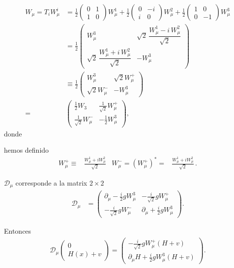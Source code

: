 \begin{align}
\label{eq:w22}
      W_\mu=T_i W^{i}_\mu&=
  \frac{1}{2}\begin{pmatrix}
    0&1\\
    1&0
  \end{pmatrix}W^1_\mu+
  \frac{1}{2}\begin{pmatrix}
    0&-i\\
    i&0
  \end{pmatrix}W^2_\mu+
  \frac{1}{2}\begin{pmatrix}
    1&0\\
    0&-1
  \end{pmatrix}W^3_\mu\nonumber\\
  &=
  \frac{1}{2}\begin{pmatrix}
    W^3_\mu                                  &\sqrt{2}\,\dfrac{W^1_\mu-i\,W^2_\mu}{\sqrt{2}}\\
    \sqrt{2}\,\dfrac{W^1_\mu+i\,W^2_\mu}{\sqrt{2}} &-W^3_\mu
  \end{pmatrix}\nonumber\\
  &\equiv
  \frac{1}{2}\begin{pmatrix}
    W^3_\mu&\sqrt{2}W^+_\mu\\
    \sqrt{2}W^-_\mu&-W^3_\mu
  \end{pmatrix}\nonumber\\
=&\begin{pmatrix}
    \frac{1}{2}W_3&\frac{1}{\sqrt{2}}W^+_\mu\\
    \frac{1}{\sqrt{2}}W^-_\mu&-\frac{1}{2}W^3_\mu
  \end{pmatrix},
\end{align}
donde
\begin{frame}
hemos definido
\begin{align}
  W_{\mu}^{+}\equiv& \frac{W_{\mu}^1+i W_{\mu}^2}{\sqrt{2}} & 
  W_{\mu}^{-}=\left( W_{\mu}^{+} \right)^{*}=& \frac{W_{\mu}^1+i W_{\mu}^2}{\sqrt{2}}\,. 
\end{align}

$\mathcal{D}_\mu$ corresponde a la matrix $2\times  2$
\begin{align}
\label{eq:d22}
 \mathcal{D}_\mu &=  \begin{pmatrix}
    \partial_\mu-\frac{i}{2}g W^3_\mu&-\frac{i}{\sqrt{2}}g W^+_\mu\\
    -\frac{i}{\sqrt{2}}g W^-_\mu&\partial_\mu+\frac{i}{2}g W^3_\mu
  \end{pmatrix}.
\end{align}
\end{frame}
Entonces
\begin{align}
\mathcal{D}_\mu \begin{pmatrix}
    0\\
    H(x)+v
  \end{pmatrix}=\begin{pmatrix}
    -\frac{i}{\sqrt{2}}gW_\mu^+(H+v)\\
    \partial_\mu H+\frac{i}{2}gW^3_\mu(H+v)
  \end{pmatrix}.
\end{align}

